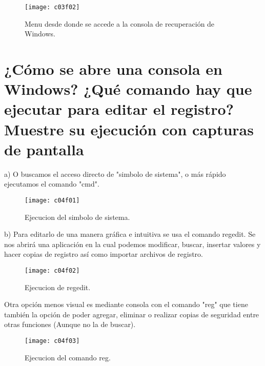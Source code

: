 \begin{figure}[H]
	\centering
	\texttt{[image: c03f02]}
	\caption{Menu desde donde se accede a la consola de recuperación de Windows.}
	\label{fig:c03f02}
\end{figure}
\clearpage
\section{¿Cómo se abre una consola en Windows? ¿Qué comando hay que ejecutar para editar el registro? Muestre su ejecución con capturas de pantalla}

a) O buscamos el acceso directo de "simbolo de sistema", o más rápido ejecutamos el comando "cmd".\\

\begin{figure}[H]
	\centering
	\texttt{[image: c04f01]}
	\caption{Ejecucion del simbolo de sistema.}
	\label{fig:c04f01}
\end{figure}

b) Para editarlo de una manera gráfica e intuitiva se usa el comando regedit. Se nos abrirá una aplicación en la cual podemos modificar, buscar, insertar valores y hacer copias de registro así como importar archivos de registro.\\

\begin{figure}[H]
	\centering
	\texttt{[image: c04f02]}
	\caption{Ejecucion de regedit.}
	\label{fig:c04f02}
\end{figure}

Otra opción menos visual es mediante consola con el comando "reg" que tiene también la opción de poder agregar, eliminar o realizar copias de seguridad entre otras funciones (Aunque no la de buscar).\\

\begin{figure}[H]
	\centering
	\texttt{[image: c04f03]}
	\caption{Ejecucion del comando reg.}
	\label{fig:c04f03}
\end{figure}

\clearpage

